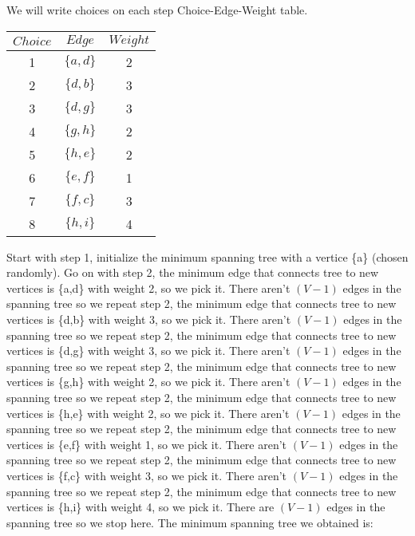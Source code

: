 \documentclass[11pt]{article}
\begin{document}
	We will write choices on each step Choice-Edge-Weight table.\\
	\begin{table}[H]
	\small
	\centering
	\begin{tabular}{|c|c|c|}	
	\hline
	$Choice$ & $Edge$ & $Weight$\\
	\hline 
	1 & $\{a,d\}$ & 2\\			
	2 & $\{d,b\}$ & 3\\	
	3 & $\{d,g\}$ & 3\\
	4 & $\{g,h\}$ & 2\\
	5 & $\{h,e\}$ & 2\\	
	6 & $\{e,f\}$ & 1\\
	7 & $\{f,c\}$ & 3\\
	8 & $\{h,i\}$ & 4\\	
	\hline 
	\end{tabular}
	\end{table}
	Start with step 1, initialize the minimum spanning tree with a vertice \{a\} (chosen randomly). Go on with step 2, the minimum edge that connects tree to new vertices is \{a,d\} with weight 2, so we pick it. There aren't $(V-1)$ edges in the spanning tree so we repeat step 2, the minimum edge that connects tree to new vertices is \{d,b\} with weight 3, so we pick it. There aren't $(V-1)$ edges in the spanning tree so we repeat step 2, the minimum edge that connects tree to new vertices is \{d,g\} with weight 3, so we pick it. There aren't $(V-1)$ edges in the spanning tree so we repeat step 2, the minimum edge that connects tree to new vertices is \{g,h\} with weight 2, so we pick it. There aren't $(V-1)$ edges in the spanning tree so we repeat step 2, the minimum edge that connects tree to new vertices is \{h,e\} with weight 2, so we pick it. There aren't $(V-1)$ edges in the spanning tree so we repeat step 2, the minimum edge that connects tree to new vertices is \{e,f\} with weight 1, so we pick it. There aren't $(V-1)$ edges in the spanning tree so we repeat step 2, the minimum edge that connects tree to new vertices is \{f,c\} with weight 3, so we pick it. There aren't $(V-1)$ edges in the spanning tree so we repeat step 2, the minimum edge that connects tree to new vertices is \{h,i\} with weight 4, so we pick it. There are $(V-1)$ edges in the spanning tree so we stop here. The minimum spanning tree we obtained is:\\
\end{document}
